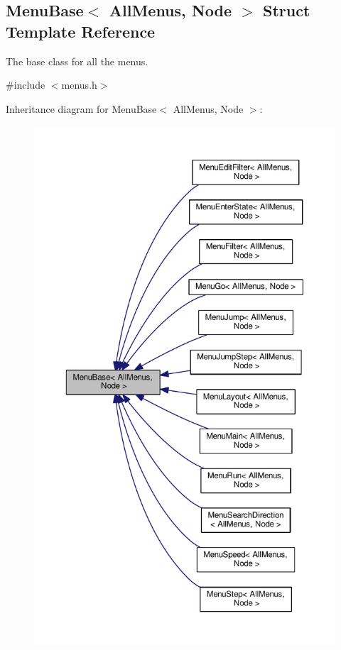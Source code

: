 \hypertarget{structMenuBase}{}\subsection{Menu\+Base$<$ All\+Menus, Node $>$ Struct Template Reference}
\label{structMenuBase}


The base class for all the menus.  




{\ttfamily \#include $<$menus.\+h$>$}



Inheritance diagram for Menu\+Base$<$ All\+Menus, Node $>$\+:\nopagebreak
\begin{figure}[H]
\begin{center}
\leavevmode
\includegraphics[height=550pt]{structMenuBase__inherit__graph}
\end{center}
\end{figure}


